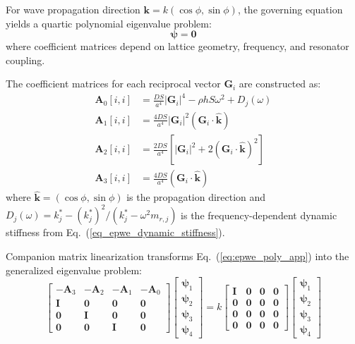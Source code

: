 \documentclass[review,numbers,sort&compress]{elsarticle}
\begin{document}
{For wave propagation direction $\mathbf{k} = k(\cos\phi, \sin\phi)$, the governing equation yields a quartic polynomial eigenvalue problem:
\begin{equation}
[\mathbf{A}_3 k^3 + \mathbf{A}_2 k^2 + \mathbf{A}_1 k + \mathbf{A}_0]\boldsymbol{\psi} = \mathbf{0}
\label{eq:epwe_poly_app}
\end{equation}
where coefficient matrices depend on lattice geometry, frequency, and resonator coupling.

The coefficient matrices for each reciprocal vector $\mathbf{G}_i$ are constructed as:
\begin{align}
\mathbf{A}_0[i,i] &= \frac{DS}{a^4}|\mathbf{G}_i|^4 - \rho h S \omega^2 + D_j(\omega) \label{eq:A0_app}\\
\mathbf{A}_1[i,i] &= \frac{4DS}{a^4}|\mathbf{G}_i|^2(\mathbf{G}_i \cdot \hat{\mathbf{k}}) \label{eq:A1_app}\\
\mathbf{A}_2[i,i] &= \frac{2DS}{a^4}[|\mathbf{G}_i|^2 + 2(\mathbf{G}_i \cdot \hat{\mathbf{k}})^2] \label{eq:A2_app}\\
\mathbf{A}_3[i,i] &= \frac{4DS}{a^4}(\mathbf{G}_i \cdot \hat{\mathbf{k}}) \label{eq:A3_app}
\end{align}
where $\hat{\mathbf{k}} = (\cos\phi, \sin\phi)$ is the propagation direction and $D_j(\omega) = k_j^* - (k_j^*)^2/(k_j^* - \omega^2 m_{r,j})$ is the frequency-dependent dynamic stiffness from Eq.~(\ref{eq_epwe_dynamic_stiffness}).

Companion matrix linearization transforms Eq.~(\ref{eq:epwe_poly_app}) into the generalized eigenvalue problem:
\begin{equation}
\begin{bmatrix}
-\mathbf{A}_3 & -\mathbf{A}_2 & -\mathbf{A}_1 & -\mathbf{A}_0 \\
\mathbf{I} & \mathbf{0} & \mathbf{0} & \mathbf{0} \\
\mathbf{0} & \mathbf{I} & \mathbf{0} & \mathbf{0} \\
\mathbf{0} & \mathbf{0} & \mathbf{I} & \mathbf{0}
\end{bmatrix}
\begin{bmatrix}
\boldsymbol{\psi}_1 \\ \boldsymbol{\psi}_2 \\ \boldsymbol{\psi}_3 \\ \boldsymbol{\psi}_4
\end{bmatrix} = k
\begin{bmatrix}
\mathbf{I} & \mathbf{0} & \mathbf{0} & \mathbf{0} \\
\mathbf{0} & \mathbf{0} & \mathbf{0} & \mathbf{0} \\
\mathbf{0} & \mathbf{0} & \mathbf{0} & \mathbf{0} \\
\mathbf{0} & \mathbf{0} & \mathbf{0} & \mathbf{0}
\end{bmatrix}
\begin{bmatrix}
\boldsymbol{\psi}_1 \\ \boldsymbol{\psi}_2 \\ \boldsymbol{\psi}_3 \\ \boldsymbol{\psi}_4
\end{bmatrix}
\label{eq:companion_app}
\end{equation}

}
\end{document}

